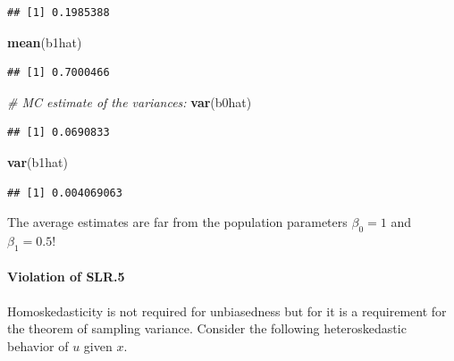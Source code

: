 \documentclass[]{book}
\newenvironment{Shaded}{\begin{snugshade}}{\end{snugshade}}
\newcommand{\CommentTok}[1]{\textcolor[rgb]{0.56,0.35,0.01}{\textit{#1}}}
\newcommand{\KeywordTok}[1]{\textcolor[rgb]{0.13,0.29,0.53}{\textbf{#1}}}
\newcommand{\NormalTok}[1]{#1}
\let\oldparagraph\paragraph
\renewcommand{\paragraph}[1]{\oldparagraph{#1}\mbox{}}
\begin{document}
\begin{verbatim}
## [1] 0.1985388
\end{verbatim}

\begin{Shaded}
\begin{Highlighting}[]
\KeywordTok{mean}\NormalTok{(b1hat)}
\end{Highlighting}
\end{Shaded}

\begin{verbatim}
## [1] 0.7000466
\end{verbatim}

\begin{Shaded}
\begin{Highlighting}[]
\CommentTok{# MC estimate of the variances:}
\KeywordTok{var}\NormalTok{(b0hat)}
\end{Highlighting}
\end{Shaded}

\begin{verbatim}
## [1] 0.0690833
\end{verbatim}

\begin{Shaded}
\begin{Highlighting}[]
\KeywordTok{var}\NormalTok{(b1hat)}
\end{Highlighting}
\end{Shaded}

\begin{verbatim}
## [1] 0.004069063
\end{verbatim}

The average estimates are far from the population parameters \(\beta_0=1\) and \(\beta_1 = 0.5\)!

\hypertarget{violation-of-slr.5}{%
\paragraph{Violation of SLR.5}\label{violation-of-slr.5}}

Homoskedasticity is not required for unbiasedness but for it is a requirement for the theorem of sampling variance. Consider the following heteroskedastic behavior of \(u\) given \(x\).
\end{document}
